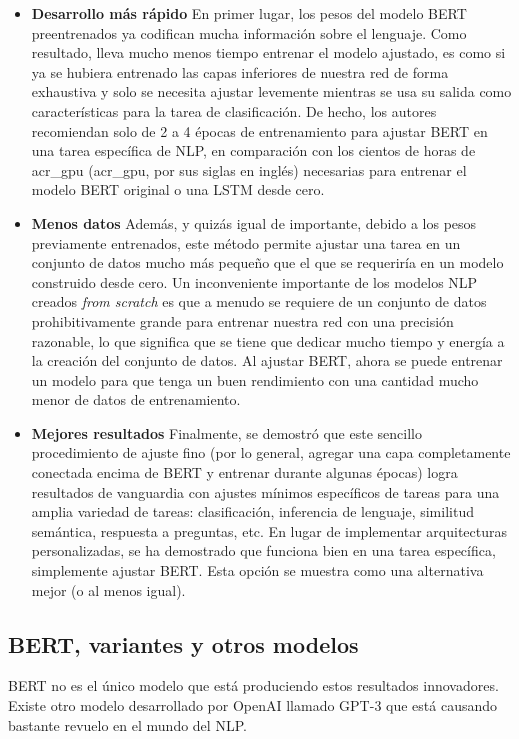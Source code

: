 \begin{itemize}
    \item \textbf{Desarrollo más rápido}
En primer lugar, los pesos del modelo BERT preentrenados ya codifican mucha información sobre el lenguaje. Como resultado, lleva mucho menos tiempo entrenar el modelo ajustado, es como si ya se hubiera entrenado las capas inferiores de nuestra red de forma exhaustiva y solo se necesita ajustar levemente mientras se usa su salida como características para la tarea de clasificación. De hecho, los autores recomiendan solo de 2 a 4 épocas de entrenamiento para ajustar BERT en una tarea específica de NLP, en comparación con los cientos de horas de \acrlong{acr_gpu} (\acrshort{acr_gpu}, por sus siglas en inglés) necesarias para entrenar el modelo BERT original o una LSTM desde cero.
\item \textbf{Menos datos}
Además, y quizás igual de importante, debido a los pesos previamente entrenados, este método permite ajustar una tarea en un conjunto de datos mucho más pequeño que el que se requeriría en un modelo construido desde cero. Un inconveniente importante de los modelos NLP creados \textit{from scratch} es que a menudo se requiere de un conjunto de datos prohibitivamente grande para entrenar nuestra red con una precisión razonable, lo que significa que se tiene que dedicar mucho tiempo y energía a la creación del conjunto de datos. Al ajustar BERT, ahora se puede entrenar un modelo para que tenga un buen rendimiento con una cantidad mucho menor de datos de entrenamiento.
\item \textbf{Mejores resultados}
Finalmente, se demostró que este sencillo procedimiento de ajuste fino (por lo general, agregar una capa completamente conectada encima de BERT y entrenar durante algunas épocas) logra resultados de vanguardia con ajustes mínimos específicos de tareas para una amplia variedad de tareas: clasificación, inferencia de lenguaje, similitud semántica, respuesta a preguntas, etc. En lugar de implementar arquitecturas personalizadas, se ha demostrado que funciona bien en una tarea específica, simplemente ajustar BERT. Esta opción se muestra como una alternativa mejor (o al menos igual).
\end{itemize}

\subsection{BERT, variantes y otros modelos}
\label{subsection-bert-otros}

BERT no es el único modelo que está produciendo estos resultados innovadores. Existe otro modelo desarrollado por OpenAI llamado GPT-3 \citep{articleBrownGPT3} que está causando bastante revuelo en el mundo del NLP.  


